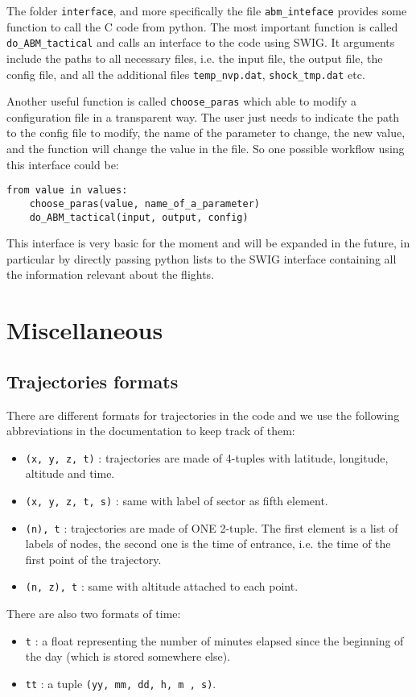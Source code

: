 \documentclass[12pt]{article}
\begin{document}
The folder \verb|interface|, and more specifically the file \verb|abm_inteface| provides some function to call the C code from python. The most important function is called \verb|do_ABM_tactical| and calls an interface to the code using SWIG. It arguments include the paths to all necessary files, i.e. the input file, the output file, the config file, and all the additional files \verb|temp_nvp.dat|, \verb|shock_tmp.dat| etc.

Another useful function is called \verb|choose_paras| which able to modify a configuration file in a transparent way. The user just needs to indicate the path to the config file to modify, the name of the parameter to change, the new value, and the function will change the value in the file. So one possible workflow using this interface could be:

\begin{verbatim}
from value in values:
    choose_paras(value, name_of_a_parameter)
    do_ABM_tactical(input, output, config)
\end{verbatim} 

This interface is very basic for the moment and will be expanded in the future, in particular by directly passing python lists to the SWIG interface containing all the information relevant about the flights.

\section{Miscellaneous}

\subsection{Trajectories formats}

There are different formats for trajectories in the code and we use the following abbreviations in the documentation to keep track of them:
\begin{itemize}
\item  \verb|(x, y, z, t)| : trajectories are made of 4-tuples with latitude, longitude, altitude and 
time.
\item \verb|(x, y, z, t, s)| : same with label of sector as fifth element.
\item \verb|(n), t| : trajectories are made of ONE 2-tuple. The first element is a list of labels
of nodes, the second one is the time of entrance, i.e. the time of the first point of the trajectory.
\item \verb|(n, z), t| : same with altitude attached to each point.
\end{itemize}
There are also two formats of time:
\begin{itemize}
\item \verb|t| : a float representing the number of minutes elapsed since the beginning of 
the day (which is stored somewhere else).
\item \verb|tt| : a tuple \verb|(yy, mm, dd, h, m , s)|.
\end{itemize}
\end{document}
